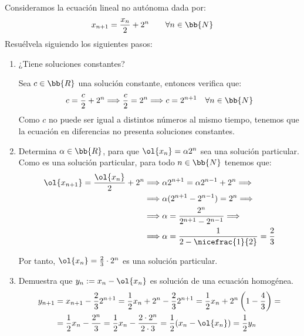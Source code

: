 \begin{ejercicio*}
    Consideramos la ecuación lineal no autónoma dada por:
    \begin{equation*}
        x_{n+1} = \frac{x_n}{2} + 2^n\qquad \forall n \in \bb{N}
    \end{equation*}
    Resuélvela siguiendo los siguientes pasos:
    \begin{enumerate}
        \item ¿Tiene soluciones constantes?

        Sea $c\in\bb{R}$ una solución constante, entonces verifica que:
        \begin{equation*}
            c = \dfrac{c}{2}+2^n \Longrightarrow \dfrac{c}{2} = 2^n \Longrightarrow c = 2^{n+1}\quad \forall n \in \bb{N}
        \end{equation*}
        Como $c$ no puede ser igual a distintos números al mismo tiempo, tenemos que la ecuación en diferencias no presenta soluciones constantes.
        \item Determina $\alpha\in \bb{R}$, para que $\ol{x_n}=\alpha 2^n$ sea una solución particular.\\

        Como es una solución particular, para todo $n\in \bb{N}$ tenemos que:
        \begin{align*}
            \ol{x_{n+1}} = \frac{\ol{x_n}}{2} + 2^n & \Longrightarrow 
            \alpha 2^{n+1} = \alpha 2^{n-1} + 2^n \Longrightarrow \\&\Longrightarrow
            \alpha (2^{n+1} - 2^{n-1}) = 2^n
            \Longrightarrow \\&\Longrightarrow
            \alpha = \dfrac{2^n}{2^{n+1}-2^{n-1}} 
            \Longrightarrow \\&\Longrightarrow
            \alpha = \dfrac{1}{2-\nicefrac{1}{2}} = \dfrac{2}{3}
        \end{align*}

        Por tanto, $\ol{x_n} = \frac{2}{3}\cdot 2^n$ es una solución particular.
        
        \item Demuestra que $y_n:=x_n-\ol{x_n}$ es solución de una ecuación homogénea.
        \begin{align*}
            y_{n+1} &= x_{n+1} - \dfrac{2}{3}2^{n+1} = \dfrac{1}{2}x_n + 2^n - \dfrac{2}{3}2^{n+1}
            = \frac{1}{2}x_n + 2^n\left(1-\frac{4}{3}\right)=\\
            &= \frac{1}{2}x_n - \frac{2^n}{3}
            = \frac{1}{2}x_n - \frac{2\cdot 2^n}{2\cdot 3}
            =\dfrac{1}{2}(x_n-\ol{x_n})
            = \dfrac{1}{2}y_n 
        \end{align*}


\end{enumerate}
\end{ejercicio*}
